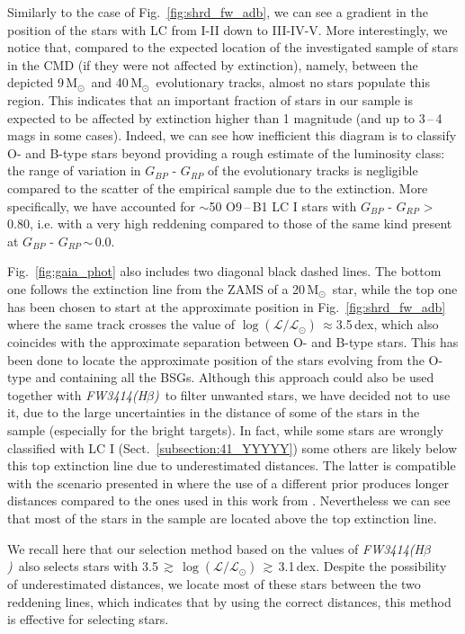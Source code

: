 \documentclass{aa}
\newcommand{\MSol}{\mbox{M$_\odot$}}
\newcommand{\logLs}{$\log (\mathcal{L}/\mathcal{L}_{\odot})$}
\newcommand{\gs}{\mbox{$\gtrsim$}}
\newcommand{\fwhb}{\textit{FW3414(H$\beta$)}}
\begin{document}
Similarly to the case of Fig.~\ref{fig:shrd_fw_adb}, we can see a gradient in the position of the stars with LC from I-II down to III-IV-V. More interestingly, we notice that, compared to the expected location of the investigated sample of stars in the CMD (if they were not affected by extinction), namely, between the depicted 9\,\MSol\ and 40\,\MSol\ evolutionary tracks, almost no stars populate this region. This indicates that an important fraction of stars in our sample is expected to be affected by extinction higher than 1 magnitude (and up to 3\,--\,4 mags in some cases).
Indeed, we can see how inefficient this diagram is to classify O- and B-type stars beyond providing a rough estimate of the luminosity class: the range of variation in $G_{BP}$ - $G_{RP}$ of the evolutionary tracks is negligible compared to the scatter of the empirical sample due to the extinction. More specifically, we have accounted for $\sim$50 O9\,--\,B1 LC I stars with $G_{BP}$ - $G_{RP}$ > 0.80, i.e. with a very high reddening compared to those of the same kind present at $G_{BP}$ - $G_{RP}$\,$\sim$\,0.0.

Fig.~\ref{fig:gaia_phot} also includes two diagonal black dashed lines. The bottom one follows the extinction line from the ZAMS of a 20\,\MSol\ star, while the top one has been chosen to start at the approximate position in Fig.~\ref{fig:shrd_fw_adb} where the same track crosses the value of \logLs\,$\approx$3.5\,dex, which also coincides with the approximate separation between O- and B-type stars. This has been done to locate the approximate position of the stars evolving from the O-type and containing all the BSGs. Although this approach could also be used together with \fwhb\ to filter unwanted stars, we have decided not to use it, due to the large uncertainties in the distance of some of the stars in the sample (especially for the bright targets). In fact, while some stars are wrongly classified with LC I (Sect.~\ref{subsection:41_YYYYY}) some others are likely below this top extinction line due to underestimated distances. The latter is compatible with the scenario presented in \cite{2021MNRAS.504.2968P} where the use of a different prior produces longer distances compared to the ones used in this work from \cite{2021AJ....161..147B}. Nevertheless we can see that most of the stars in the sample are located above the top extinction line. 

We recall here that our selection method based on the values of \fwhb\ also selects stars with 3.5\,\gs\,\logLs\,\gs\,3.1\,dex. Despite the possibility of underestimated distances, we locate most of these stars between the two reddening lines, which indicates that by using the correct distances, this method is effective for selecting stars.
\end{document}

